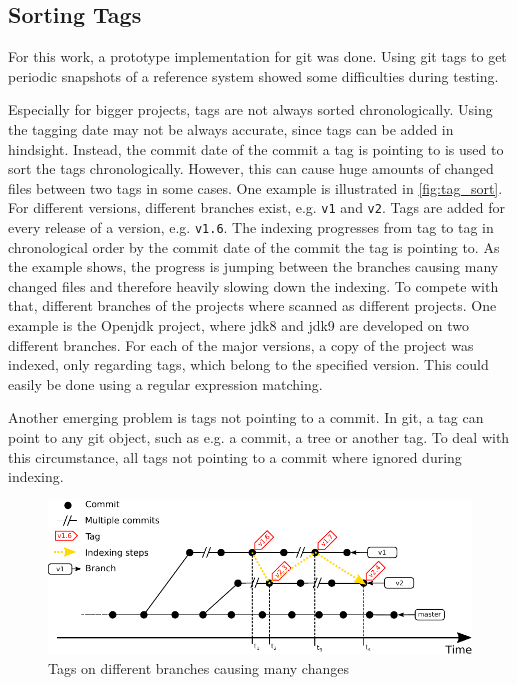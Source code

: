 \subsection{Sorting Tags}\label{section:implementation/history_analysis/sorting_tags}
For this work, a prototype implementation for git was done.
Using git tags to get periodic snapshots of a reference system showed some difficulties during testing.

Especially for bigger projects, tags are not always sorted chronologically.
Using the tagging date may not be always accurate, since tags can be added in hindsight.
Instead, the commit date of the commit a tag is pointing to is used to sort the tags chronologically.
However, this can cause huge amounts of changed files between two tags in some cases.
One example is illustrated in \autoref{fig:tag_sort}.
For different versions, different branches exist, e.g. \texttt{v1} and \texttt{v2}.
Tags are added for every release of a version, e.g. \texttt{v1.6}.
The indexing progresses from tag to tag in chronological order by the commit date of the commit the tag is pointing to.
As the example shows, the progress is jumping between the branches causing many changed files and therefore heavily slowing down the indexing.
To compete with that, different branches of the projects where scanned as different projects.
One example is the Openjdk project, where jdk8 and jdk9 are developed on two different branches.
For each of the major versions, a copy of the project was indexed, only regarding tags, which belong to the specified version.
This could easily be done using a regular expression matching.

Another emerging problem is tags not pointing to a commit.
In git, a tag can point to any git object, such as e.g. a commit, a tree or another tag.
To deal with this circumstance, all tags not pointing to a commit where ignored during indexing.

\begin{figure}[h]
	\centering
	\includegraphics{figures/tag_sort.pdf}
	\caption{Tags on different branches causing many changes}\label{fig:tag_sort}
\end{figure}

